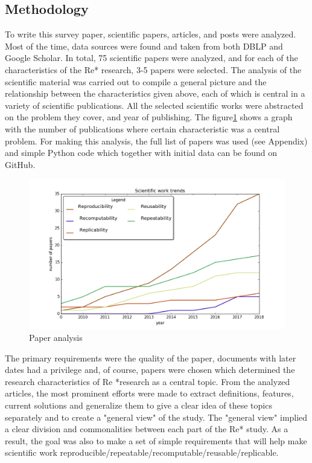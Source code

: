 \documentclass{vldb}
\begin{document}
\subsection{Methodology}
To write this survey paper, scientific papers, articles, and posts were analyzed. Most of the time, data sources were found and taken from both DBLP\cite{dblp} and Google Scholar\cite{google}. In total, 75 scientific papers were analyzed, and for each of the characteristics of the Re* research, 3-5 papers were selected. The analysis of the scientific material was carried out to compile a general picture and the relationship between the characteristics given above, each of which is central in a variety of scientific publications. All the selected scientific works were abstracted on the problem they cover, and year of publishing. The figure\ref{fig:figure1} shows a graph with the number of publications where certain characteristic was a central problem. For making this analysis, the full list of papers was used (see Appendix) and simple Python code which together with initial data can be found on GitHub\cite{gith}. 
\begin{figure}[h!]
\hspace*{-1.5cm}  
  \includegraphics[scale=0.40]{fig/figure1.png}
  \caption{Paper analysis}
  \label{fig:figure1}
\end{figure} \par
The primary requirements were the quality of the paper, documents with later dates had a privilege and, of course, papers were chosen which determined the research characteristics of Re *research as a central topic. From the analyzed articles, the most prominent efforts were made to extract definitions, features, current solutions and generalize them to give a clear idea of these topics separately and to create a "general view" of the study. The "general view" implied a clear division and commonalities between each part of the Re* study. As a result, the goal was also to make a set of simple requirements that will help make scientific work reproducible/repeatable/recomputable/reusable/replicable.
\end{document}
